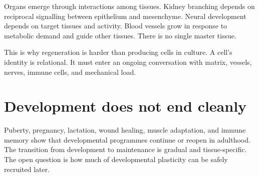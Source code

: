 Organs emerge through interactions among tissues. Kidney branching depends on reciprocal signalling between epithelium and mesenchyme. Neural development depends on target tissues and activity. Blood vessels grow in response to metabolic demand and guide other tissues. There is no single master tissue.

This is why regeneration is harder than producing cells in culture. A cell's identity is relational. It must enter an ongoing conversation with matrix, vessels, nerves, immune cells, and mechanical load.

\section{Development does not end cleanly}\label{development-does-not-end-cleanly}

Puberty, pregnancy, lactation, wound healing, muscle adaptation, and immune memory show that developmental programmes continue or reopen in adulthood. The transition from development to maintenance is gradual and tissue-specific. The open question is how much of developmental plasticity can be safely recruited later.
